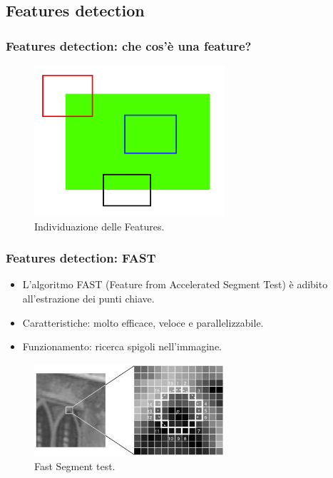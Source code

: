 \documentclass{beamer}
\begin{document}
\subsection{Features detection}
\begin{frame}
\frametitle{Features detection: che cos'è una feature?}

\begin{figure}[h]
	\centering
	\includegraphics[width=200pt]{imgs/feature_simple.png}
	\caption{Individuazione delle Features.}
	\label{vis:feature:detect}
\end{figure} 
\end{frame}

\begin{frame}
\frametitle{Features detection: FAST}
\begin{itemize}
	\item L'algoritmo FAST (Feature from Accelerated Segment Test) è adibito all'estrazione dei punti chiave.
	\item Caratteristiche: molto efficace, veloce e parallelizzabile.
	\item Funzionamento: ricerca spigoli nell'immagine.
\end{itemize}
\begin{figure}[h]
	\centering
	\includegraphics[width=200pt]{imgs/fast_speedtest.jpg}
	\caption{Fast Segment test.}
	\label{vis:feature:Fast}
\end{figure}
\end{frame}
\end{document}
